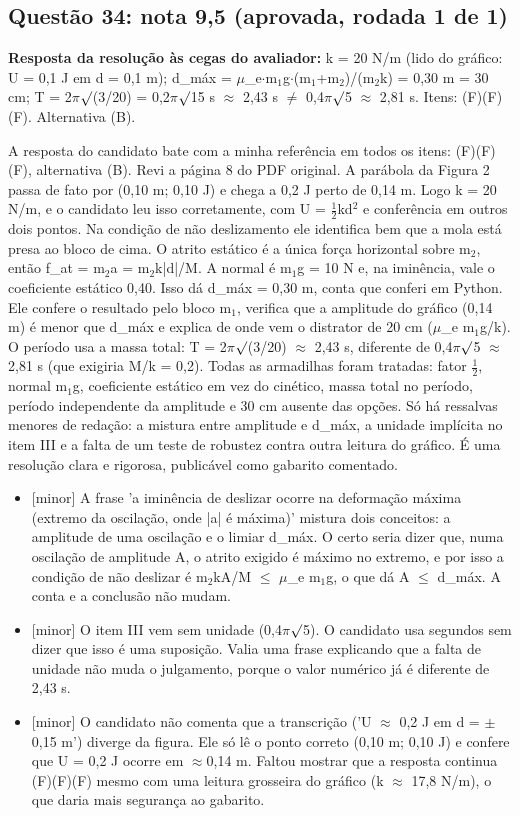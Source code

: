 \documentclass{article}%
\begin{document}
\subsection*{Questão 34: nota 9,5 (aprovada, rodada 1 de 1)}%
\textbf{Resposta da resolução às cegas do avaliador:} k = 20 N/m (lido do gráfico: U = 0,1 J em d = 0,1 m); d\_máx = $\mu$\_e$\cdot$m$_{1}$g$\cdot$(m$_{1}$+m$_{2}$)/(m$_{2}$k) = 0,30 m = 30 cm; T = 2$\pi$$\surd$(3/20) = 0,2$\pi$$\surd$15 s $\approx$ 2,43 s $\neq$ 0,4$\pi$$\surd$5 $\approx$ 2,81 s. Itens: (F)(F)(F). Alternativa (B).\par %
A resposta do candidato bate com a minha referência em todos os itens: (F)(F)(F), alternativa (B). Revi a página 8 do PDF original. A parábola da Figura 2 passa de fato por (0,10 m; 0,10 J) e chega a 0,2 J perto de 0,14 m. Logo k = 20 N/m, e o candidato leu isso corretamente, com U = $\frac12$kd$^2$ e conferência em outros dois pontos. Na condição de não deslizamento ele identifica bem que a mola está presa ao bloco de cima. O atrito estático é a única força horizontal sobre m$_{2}$, então f\_at = m$_{2}$a = m$_{2}$k|d|/M. A normal é m$_{1}$g = 10 N e, na iminência, vale o coeficiente estático 0,40. Isso dá d\_máx = 0,30 m, conta que conferi em Python. Ele confere o resultado pelo bloco m$_{1}$, verifica que a amplitude do gráfico (0,14 m) é menor que d\_máx e explica de onde vem o distrator de 20 cm ($\mu$\_e m$_{1}$g/k). O período usa a massa total: T = 2$\pi$$\surd$(3/20) $\approx$ 2,43 s, diferente de 0,4$\pi$$\surd$5 $\approx$ 2,81 s (que exigiria M/k = 0,2). Todas as armadilhas foram tratadas: fator $\frac12$, normal m$_{1}$g, coeficiente estático em vez do cinético, massa total no período, período independente da amplitude e 30 cm ausente das opções. Só há ressalvas menores de redação: a mistura entre amplitude e d\_máx, a unidade implícita no item III e a falta de um teste de robustez contra outra leitura do gráfico. É uma resolução clara e rigorosa, publicável como gabarito comentado.%
\begin{itemize}%
\item%
{[}minor{]} A frase 'a iminência de deslizar ocorre na deformação máxima (extremo da oscilação, onde |a| é máxima)' mistura dois conceitos: a amplitude de uma oscilação e o limiar d\_máx. O certo seria dizer que, numa oscilação de amplitude A, o atrito exigido é máximo no extremo, e por isso a condição de não deslizar é m$_{2}$kA/M $\leq$ $\mu$\_e m$_{1}$g, o que dá A $\leq$ d\_máx. A conta e a conclusão não mudam.%
\item%
{[}minor{]} O item III vem sem unidade (0,4$\pi$$\surd$5). O candidato usa segundos sem dizer que isso é uma suposição. Valia uma frase explicando que a falta de unidade não muda o julgamento, porque o valor numérico já é diferente de 2,43 s.%
\item%
{[}minor{]} O candidato não comenta que a transcrição ('U $\approx$ 0,2 J em d = $\pm$0,15 m') diverge da figura. Ele só lê o ponto correto (0,10 m; 0,10 J) e confere que U = 0,2 J ocorre em $\approx$0,14 m. Faltou mostrar que a resposta continua (F)(F)(F) mesmo com uma leitura grosseira do gráfico (k $\approx$ 17,8 N/m), o que daria mais segurança ao gabarito.%
\end{itemize}%
\end{document}
